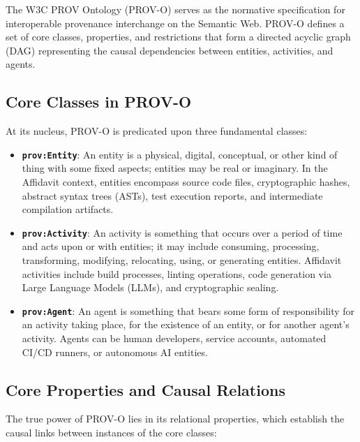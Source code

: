 The W3C PROV Ontology (PROV-O) serves as the normative specification for interoperable provenance interchange on the Semantic Web. PROV-O defines a set of core classes, properties, and restrictions that form a directed acyclic graph (DAG) representing the causal dependencies between entities, activities, and agents.

\subsection{Core Classes in PROV-O}

At its nucleus, PROV-O is predicated upon three fundamental classes:

\begin{itemize}
    \item \textbf{\texttt{prov:Entity}}: An entity is a physical, digital, conceptual, or other kind of thing with some fixed aspects; entities may be real or imaginary. In the Affidavit context, entities encompass source code files, cryptographic hashes, abstract syntax trees (ASTs), test execution reports, and intermediate compilation artifacts.
    \item \textbf{\texttt{prov:Activity}}: An activity is something that occurs over a period of time and acts upon or with entities; it may include consuming, processing, transforming, modifying, relocating, using, or generating entities. Affidavit activities include build processes, linting operations, code generation via Large Language Models (LLMs), and cryptographic sealing.
    \item \textbf{\texttt{prov:Agent}}: An agent is something that bears some form of responsibility for an activity taking place, for the existence of an entity, or for another agent's activity. Agents can be human developers, service accounts, automated CI/CD runners, or autonomous AI entities.
\end{itemize}

\subsection{Core Properties and Causal Relations}

The true power of PROV-O lies in its relational properties, which establish the causal links between instances of the core classes:

